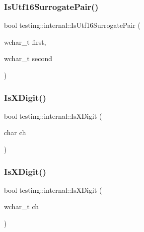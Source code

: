 \subsubsection{\texorpdfstring{Is\+Utf16\+Surrogate\+Pair()}{IsUtf16SurrogatePair()}}
{\footnotesize\ttfamily bool testing\+::internal\+::\+Is\+Utf16\+Surrogate\+Pair (\begin{DoxyParamCaption}\item[{wchar\+\_\+t}]{first,  }\item[{wchar\+\_\+t}]{second }\end{DoxyParamCaption})\hspace{0.3cm}{\ttfamily [inline]}}

\mbox{\label{namespacetesting_1_1internal_aa234ef141278263fb143b616c74c86e7}} 
\subsubsection{\texorpdfstring{Is\+X\+Digit()}{IsXDigit()}\hspace{0.1cm}{\footnotesize\ttfamily [1/2]}}
{\footnotesize\ttfamily bool testing\+::internal\+::\+Is\+X\+Digit (\begin{DoxyParamCaption}\item[{char}]{ch }\end{DoxyParamCaption})\hspace{0.3cm}{\ttfamily [inline]}}

\mbox{\label{namespacetesting_1_1internal_a6ab68a30f8291c09b2289c132bbe3b16}} 
\subsubsection{\texorpdfstring{Is\+X\+Digit()}{IsXDigit()}\hspace{0.1cm}{\footnotesize\ttfamily [2/2]}}
{\footnotesize\ttfamily bool testing\+::internal\+::\+Is\+X\+Digit (\begin{DoxyParamCaption}\item[{wchar\+\_\+t}]{ch }\end{DoxyParamCaption})\hspace{0.3cm}{\ttfamily [inline]}}


